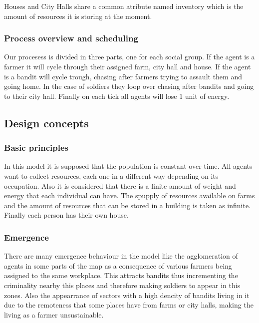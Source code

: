 \documentclass{wscpaperproc}
\begin{document}
\noindent Houses and City Halls share a common atribute named inventory which
is the amount of resources it is storing at the moment.\hfill\break

\subsubsection{Process overview and scheduling}

Our procesess is divided in three parts, one for each social group. If the
agent is a farmer it will cycle through their assigned farm, city hall and
house. If the agent is a bandit will cycle trough, chasing after farmers trying
to assault them and going home. In the case of soldiers they loop over chasing
after bandits and going to their city hall. Finally on each tick all agents
will lose 1 unit of energy.

\subsection{Design concepts}

\subsubsection{Basic principles}

In this model it is supposed that the population is constant over time.  All
agents want to collect resources, each one in a different way depending on its
occupation. Also it is considered that there is a finite amount of weight and
energy that each individual can have. The spupply of resources available on
farms and the amount of resources that can be stored in a building is taken
as infinite. Finally each person has their own house.

\subsubsection{Emergence}

There are many emergence behaviour in the model like the agglomeration of
agents in some parts of the map as a consequence of various farmers being
assigned to the same workplace. This attracts bandits thus incrementing the
criminality nearby this places and therefore making soldiers to appear in this
zones. Also the appearrance of sectors with a high dencity of bandits living in
it due to the remoteness that some places have from farms or city halls, making
the living as a farmer unsustainable.
\end{document}
